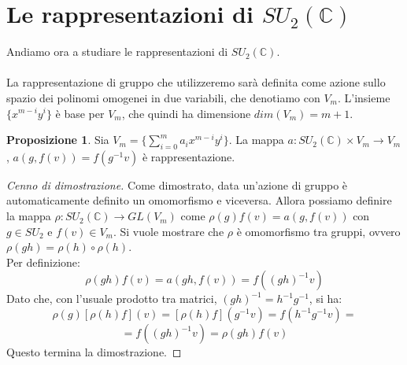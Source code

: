\documentclass[12pt,a4paper]{report}
\theoremstyle{definition}
\theoremstyle{Theorem}
\newtheorem{Prop}[Def]{Proposizione}
\theoremstyle{definition}
\theoremstyle{definition}
\theoremstyle{definition}
\begin{document}
\section{Le rappresentazioni di $SU_2(\mathbb{C})$}
Andiamo ora a studiare le rappresentazioni di $SU_2(\mathbb{C})$.\\
\\
La rappresentazione di gruppo che utilizzeremo sarà definita come azione sullo spazio dei polinomi omogenei in due variabili, che denotiamo con $V_m$.
	L'insieme $\{x^{m-i}y^i\}$ è base per $V_m$, che quindi ha dimensione $dim(V_m)=m+1$.
	\begin{comment}
		Sia $f(v)=f(x,y)$ un elemento di $V_m$ e $g$ un elemento di $SU_2(\mathbb{C})$ con inverso $g^{-1}$.\\
	Dunque, se $g\in SU_2(\mathbb{C})$ è nella forma $g=$
	$\begin{pmatrix}
	\alpha&\beta\\
	-\bar{\beta}&\bar{\alpha}
	\end{pmatrix}$,
	allora il suo inverso sarà $g^{-1}=
	\begin{pmatrix}
	\bar{\alpha}&-\beta\\
	\bar{\beta}&\alpha
	\end{pmatrix}$ dato che il determinante di $g$ è 1. \\
	Applicare $g^{-1}$ ad una coppia $(x,y)$ significa computare:
	$g^{-1}v=g^{-1}
	\begin{pmatrix}
	x\\y
	\end{pmatrix}=
	\begin{pmatrix}
	\bar{\alpha}x-\beta y\\
	\bar{\beta}x+\alpha y
	\end{pmatrix}$
	Da ciò $(g,f(x,y))\longmapsto f(\bar{\alpha}x-\beta y,\bar{\beta}x+\alpha y)$
	\end{comment}
\begin{Prop}
	Sia $V_m=\{\sum_{i=0}^{m} a_ix^{m-i}y^i\}$. La mappa $a:SU_2(\mathbb{C})\times V_m\rightarrow V_m$, $a(g,f(v))=f(g^{-1}v)$ è rappresentazione.
\end{Prop}
\begin{proof} [Cenno di dimostrazione]
	Come dimostrato, data un'azione di gruppo è automaticamente definito un omomorfismo e viceversa. Allora possiamo definire la mappa $\rho:SU_2(\mathbb{C})\rightarrow GL(V_m)$ come $\rho(g)f(v)=a(g,f(v))$ con $g\in SU_2$ e $f(v)\in V_m$.
	Si vuole mostrare che $\rho$ è omomorfismo tra gruppi, ovvero $\rho(gh)=\rho(h)\circ\rho(h)$.\\
	Per definizione:
	$$\rho(gh)f(v)=a(gh,f(v))=f((gh)^{-1}v)$$
	Dato che, con l'usuale prodotto tra matrici, $(gh)^{-1}=h^{-1}g^{-1}$, si ha:
	$$\rho(g)[\rho(h)f](v)=[\rho(h)f](g^{-1}v)=f(h^{-1}g^{-1}v)=$$
	$$=f((gh)^{-1}v)=\rho(gh)f(v)$$
	Questo termina la dimostrazione.
\end{proof}
\end{document}
